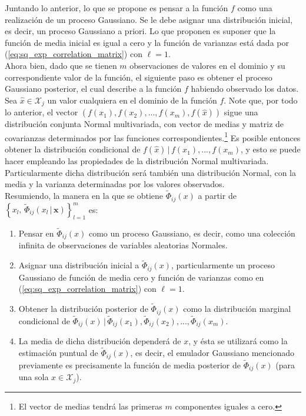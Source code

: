 Juntando lo anterior, lo que se propone es pensar a la función $f$ como una realización de un proceso Gaussiano. Se le debe asignar una distribución inicial, es decir, un proceso Gaussiano a priori. Lo que \cite{Woods_ACE} proponen es suponer que la función de media inicial es igual a cero y la función de varianzas está dada por (\ref{eq:sq_exp_correlation_matrix}) con $\ell = 1$.  \\



Ahora bien, dado que se tienen $m$ observaciones de valores en el dominio y su correspondiente valor de la función, el siguiente paso es obtener el proceso Gaussiano posterior, el cual describe a la función $f$ habiendo observado los datos. Sea $\hat{x} \in \mathcal{X}_j$ un valor cualquiera en el dominio de la función $f$. Note que, por todo lo anterior, el vector $(f(x_1), f(x_2), ..., f(x_m), f(\hat{x}))$ sigue una distribución conjunta Normal multivariada, con vector de medias y matriz de covarianzas determinados por las funciones correspondientes.\footnote{El vector de medias tendrá las primeras $m$ componentes iguales a cero.} Es posible entonces obtener la distribución condicional de $f(\hat{x}) \, | \, f(x_1), ..., f(x_m)$, y esto se puede hacer empleando las propiedades de la distribución Normal multivariada. Particularmente dicha distribución será también una distribución Normal, con la media y la varianza determinadas por los valores observados. \\ 


Resumiendo, la manera en la que se obtiene $\tilde{\Phi}_{ij}(x)$ a partir de \newline $\left\{ x_l, \, \tilde{\Phi}_{ij}(x_l \, | \, \mathbf{x} ) \right\}_{l=1}^{m}$ es:
\begin{enumerate}
\item Pensar en $\tilde{\Phi}_{ij}(x)$ como un proceso Gaussiano, es decir, como una colección infinita de observaciones de variables aleatorias Normales.
\item Asignar una distribución inicial a $\tilde{\Phi}_{ij}(x)$, particularmente un proceso Gaussiano de función de media cero y función de varianzas como en (\ref{eq:sq_exp_correlation_matrix}) con $\ell=1$.
\item Obtener la distribución posterior de $\tilde{\Phi}_{ij}(x)$ como la distribución marginal condicional de $\tilde{\Phi}_{ij}(x) \, | \, \tilde{\Phi}_{ij}(x_1), \tilde{\Phi}_{ij}(x_2), ..., \tilde{\Phi}_{ij}(x_m)$.
\item La media de dicha distribución dependerá de $x$, y ésta se utilizará como la estimación puntual de $\tilde{\Phi}_{ij}(x)$, es decir, el emulador Gaussiano mencionado previamente es precisamente la función de media posterior de $\tilde{\Phi}_{ij}(x)$ (para una sola $x \in \mathcal{X}_j$).
\end{enumerate}



